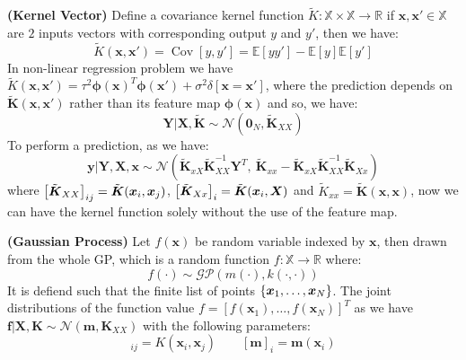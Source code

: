 \begin{remark}{\textbf{(Kernel Vector)}}
    Define a covariance kernel function $\tilde{K}:\mathbb{X}\times \mathbb{X}\rightarrow \mathbb{R}$ if $\boldsymbol x, \boldsymbol x' \in \mathbb{X}$ are $2$ inputs vectors with corresponding output $y$ and $y'$, then we have:
    \begin{equation*}
        \tilde{K}(\boldsymbol x,\boldsymbol x') = \operatorname{Cov}[y, y'] = \mathbb{E}[yy'] - \mathbb{E}[y]\mathbb{E}[y']
    \end{equation*}
    In non-linear regression problem we have $\tilde{K}(\boldsymbol x, \boldsymbol x') =\tau^2\boldsymbol \phi(\boldsymbol x)^T\boldsymbol \phi(\boldsymbol x') + \sigma^2\delta[\boldsymbol x = \boldsymbol x']$, where the prediction depends on $\tilde{\boldsymbol K}(\boldsymbol x, \boldsymbol x')$ rather than its feature map $\boldsymbol \phi(\boldsymbol x)$ and so, we have:
    \begin{equation*}
        \boldsymbol Y | \boldsymbol X, \tilde{\boldsymbol K} \sim \mathcal{N}(\boldsymbol 0_N, \tilde{\boldsymbol K}_{XX})
    \end{equation*}
    To perform a prediction, as we have:
    \begin{equation*}
        \boldsymbol y | \boldsymbol Y, \boldsymbol X, \boldsymbol x \sim \mathcal{N}(\tilde{\boldsymbol K}_{xX}\tilde{\boldsymbol K}_{XX}^{-1}\boldsymbol Y^T, \ \tilde{\boldsymbol K}_{xx}-\tilde{\boldsymbol K}_{xX}\tilde{\boldsymbol K}^{-1}_{XX}\tilde{\boldsymbol K}_{Xx})
    \end{equation*}
    where $\left[ \tilde{\boldsymbol K}_{XX} \right]_{ij} = \tilde{\boldsymbol K}(\boldsymbol x_i, \boldsymbol x_j)$, $\left[ \tilde{\boldsymbol K}_{Xx} \right]_i = \tilde{\boldsymbol K}(\boldsymbol x_i, \boldsymbol X)$ and $\tilde{K}_{xx} = \tilde{\boldsymbol K}(\boldsymbol x, \boldsymbol x)$, now we can have the kernel function solely without the use of the feature map. 
\end{remark}

\begin{definition}{\textbf{(Gaussian Process)}}
    Let $f(\boldsymbol x)$ be random variable indexed by $\boldsymbol x$, then drawn from the whole GP, which is a random function $f:\mathbb{X}\rightarrow \mathbb{R}$ where:
    \begin{equation*}
        f(\cdot) \sim \mathcal{GP}(m(\cdot), k(\cdot, \cdot))
    \end{equation*}
    It is defiend such that the finite list of points $\left\{ \boldsymbol x_1,\dots,\boldsymbol x_N \right\}$. The joint distributions of the function value $f=[f(\boldsymbol x_1),\dots,f(\boldsymbol x_N)]^T$ as we have $\boldsymbol f | \boldsymbol X, \boldsymbol K \sim \mathcal{N}(\boldsymbol m, \boldsymbol K_{XX})$ with the following parameters:
    \begin{equation*}
        [\boldsymbol K_{XX}]_{ij} = K(\boldsymbol x_i, \boldsymbol x_j) \qquad [\boldsymbol m]_i = \boldsymbol m(\boldsymbol x_i)
    \end{equation*}
\end{definition}

